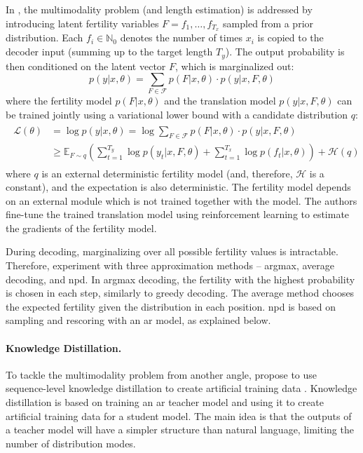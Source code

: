 In \citet{gu2017nonautoregressive}, the multimodality problem (and length
estimation) is addressed by introducing latent fertility variables
$F = f_1, \ldots, f_{T_x}$ sampled from a prior distribution. Each
$f_i \in \mathbb{N}_0$ denotes the number of times $x_i$ is copied to the
decoder input (summing up to the target length $T_y$). The output probability
is then conditioned on the latent vector $F$, which is marginalized out:
%
\begin{equation}
  p(y|x, \theta) = \sum_{F \in \mathcal{F}} p(F|x, \theta) \cdot p(y|x, F, \theta)
\end{equation}
%
where the fertility model $p(F|x, \theta)$ and the translation model
$p(y|x, F, \theta)$ can be trained jointly using a variational lower bound with
a candidate distribution $q$:
\begin{align}
  \begin{split}
    \mathcal{L}(\theta)
    & = \log p(y|x, \theta) = \log \sum_{F \in \mathcal{F}} p(F| x, \theta ) \cdot p(y | x, F, \theta) \\
    & \geq \mathbb{E}_{F \sim q} \left(\sum_{t=1}^{T_y} \log p(y_t | x, F,
      \theta) + \sum_{t=1}^{T_x} \log p(f_t | x, \theta) \right) +
    \mathcal{H}(q)
  \end{split}
\end{align}
%
where $q$ is an external deterministic fertility model (and, therefore,
$\mathcal{H}$ is a constant), and the expectation is also deterministic.  The
fertility model depends on an external module which is not trained together
with the model. The authors fine-tune the trained translation model using
reinforcement learning \citep{williams1992simple} to estimate the gradients of
the fertility model.

During decoding, marginalizing over all possible fertility values is
intractable. Therefore, \citet{gu2017nonautoregressive} experiment with three
approximation methods -- argmax, average decoding, and \ac{npd}. In argmax
decoding, the fertility with the highest probability is chosen in each step,
similarly to greedy decoding. The average method chooses the expected fertility
given the distribution in each position. \ac{npd} is based on sampling and
rescoring with an \acl{ar} model, as explained below.

\paragraph{Knowledge Distillation.} To tackle the multimodality problem from
another angle, \citet{gu2017nonautoregressive} propose to use sequence-level
knowledge distillation to create artificial training data
\citep{kim-rush-2016-sequence}. Knowledge distillation is based on training an
\ac{ar} teacher model and using it to create artificial training data for a
student model. The main idea is that the outputs of a teacher model will have a
simpler structure than natural language, limiting the number of distribution
modes.


